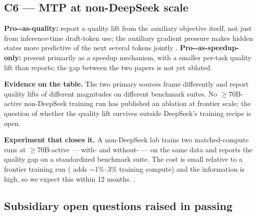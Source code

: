 \subsection{C6 --- MTP at non-DeepSeek scale}
\label{sec:c-mtp}

\textbf{Pro--as-quality:} \citet{deepseek-v3} report a quality lift
from the  auxiliary objective itself, not just
from inference-time draft-token use; the auxiliary gradient pressure
makes hidden states more predictive of the next several tokens jointly
\citep[\S 2.2]{deepseek-v3}. \textbf{Pro--as-speedup-only:}
\citet{gloeckle2024-mtp} present  primarily as a speedup mechanism,
with a smaller per-task quality lift than  reports; the gap
between the two papers is not yet ablated.

\textbf{Evidence on the table.} The two primary sources frame 
differently and report quality lifts of different magnitudes on
different benchmark suites. No $\geq 70\mathrm{B}$-active non-DeepSeek
training run has published an  ablation at frontier scale; the
question of whether the quality lift survives outside DeepSeek's
training recipe is open.

\textbf{Experiment that closes it.} A non-DeepSeek lab trains two
matched-compute runs at $\geq 70\mathrm{B}$-active --- with- and
without- --- on the same data and reports the quality gap on a
standardized benchmark suite. The cost is small relative to a frontier
training run ( adds $\sim$1\%--3\% training compute) and the
information  is high, so we expect this within 12 months.
.

\subsection{Subsidiary open questions raised in passing}
\label{sec:c-subsidiary}


